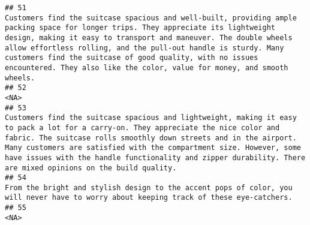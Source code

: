 \documentclass[
]{article}
\begin{document}
\begin{verbatim}
## 51                                                                                                                                                                                                          Customers find the suitcase spacious and well-built, providing ample packing space for longer trips. They appreciate its lightweight design, making it easy to transport and maneuver. The double wheels allow effortless rolling, and the pull-out handle is sturdy. Many customers find the suitcase of good quality, with no issues encountered. They also like the color, value for money, and smooth wheels.
## 52                                                                                                                                                                                                                                                                                                                                                                                                                                                                                                                                                                                                                       <NA>
## 53                                                                                                                                                                                                                           Customers find the suitcase spacious and lightweight, making it easy to pack a lot for a carry-on. They appreciate the nice color and fabric. The suitcase rolls smoothly down streets and in the airport. Many customers are satisfied with the compartment size. However, some have issues with the handle functionality and zipper durability. There are mixed opinions on the build quality.
## 54                                                                                                                                                                                                                                                                                                                                                                                                                                                                                   From the bright and stylish design to the accent pops of color, you will never have to worry about keeping track of these eye-catchers. 
## 55                                                                                                                                                                                                                                                                                                                                                                                                                                                                                                                                                                                                                       <NA>

\end{verbatim}
\end{document}
